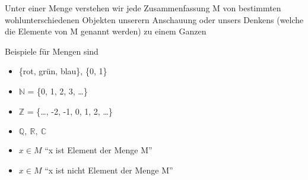 \documentclass{../../meta/tudscript}
\begin{document}


Unter einer Menge verstehen wir jede Zusammenfassung M von bestimmten
wohlunterschiedenen Objekten unserern Anschauung oder unsers Denkens
(welche die Elemente von M genannt werden) zu einem Ganzen

Beispiele für Mengen sind

\begin{itemize}
\item \{rot, grün, blau\}, \{0, 1\}
\item \(\mathbb{N}\) = \{0, 1, 2, 3, \ldots{}\}
\item \(\mathbb{Z}\) = \{\ldots{}, -2, -1, 0, 1, 2, \ldots{}\}
\item \(\mathbb{Q}, \> \mathbb{R}, \> \mathbb{C}\)
\end{itemize}


\begin{itemize}
\item \(x \in M\) ``x ist Element der Menge M''
\item \(x \in M\) ``x ist nicht Element der Menge M''
\end{itemize}
\end{document}
